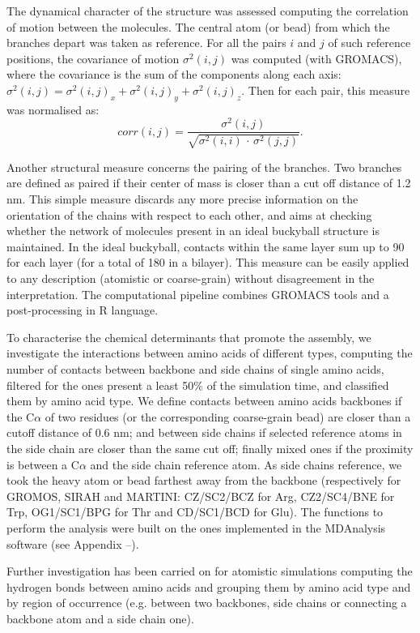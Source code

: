 The dynamical character of the structure was assessed computing the correlation of motion between the molecules. The central atom (or bead) from which the branches depart was taken as reference. For all the pairs $i$ and $j$ of such reference positions, the covariance of motion $\sigma^2(i,j)$ was computed (with GROMACS), where the covariance is the sum of the components along each axis: $\sigma^2(i,j) = \sigma^2(i,j)_x + \sigma^2(i,j)_y + \sigma^2(i,j)_z$. Then for each pair, this measure was normalised as:
\begin{equation}
corr(i,j) = \frac{\sigma^2(i,j)}{\sqrt{\sigma^2(i,i)\,\cdot\,\sigma^2(j,j)}}.
\end{equation}

Another structural measure concerns the pairing of the branches. Two branches are defined as paired if their center of mass is closer than a cut off distance of 1.2 nm. This simple measure discards any more precise information on the orientation of the chains with respect to each other, and aims at checking whether the network of molecules present in an ideal buckyball structure is maintained. In the ideal buckyball, contacts within the same layer sum up to 90 for each layer (for a total of 180 in a bilayer). This measure can be easily applied to any description (atomistic or coarse-grain) without disagreement in the interpretation. The computational pipeline combines GROMACS tools and a post-processing in R language.

To characterise the chemical determinants that promote the assembly, we investigate the interactions between amino acids of different types, computing the number of contacts between backbone and side chains of single amino acids, filtered for the ones present a least 50\% of the simulation time, and classified them by amino acid type.
%
We define contacts between amino acids backbones if the C$\alpha$ of two residues (or the corresponding coarse-grain bead) are closer than a cutoff distance of 0.6 nm; and between side chains if selected reference atoms in the side chain are closer than the same cut off; finally mixed ones if the proximity is between a C$\alpha$ and the side chain reference atom. As side chains reference, we took the heavy atom or bead farthest away from the backbone (respectively for GROMOS, SIRAH and MARTINI: CZ/SC2/BCZ for Arg, CZ2/SC4/BNE for Trp, OG1/SC1/BPG for Thr and CD/SC1/BCD for Glu). The functions to perform the analysis were built on the ones implemented in the MDAnalysis software (see Appendix --).

Further investigation has been carried on for atomistic simulations computing the hydrogen bonds between amino acids and grouping them by amino acid type and by region of occurrence (e.g. between two backbones, side chains or connecting a backbone atom and a side chain one).

